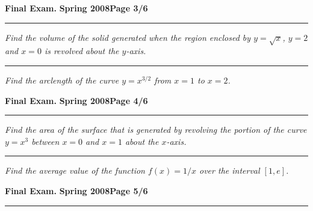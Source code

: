 \documentclass[12pt]{article}
\begin{document}
\hfill{\large\bf Final Exam.}\hfill{\large\bf
  Spring 2008}\hfill{\large\bf Page 3/6}\hrule

\bigskip
{\problem[10 pts] \em Find the volume of the solid generated when the region enclosed by $y=\sqrt{x}$, $y=2$ and $x=0$ is revolved about the $y$-axis.}
\vspace{8.5cm}
\begin{flushright}
\end{flushright}
\hrule
{\problem[10 pts] \em Find the arclength of the curve $y=x^{3/2}$ from $x=1$ to $x=2$.}
\vspace{8.5cm}
\begin{flushright}
\end{flushright}
\newpage

\hfill{\large\bf Final Exam.}\hfill{\large\bf
  Spring 2008}\hfill{\large\bf Page 4/6}\hrule

\bigskip
{\problem[10 pts] \em Find the area of the surface that is generated by revolving the portion of the curve $y=x^3$ between $x=0$ and $x=1$ about the $x$-axis.}
\vspace{8.5cm}
\begin{flushright}
\end{flushright}
\hrule
{\problem[10 pts] \em Find the average value of the function $f(x) = 1/x$ over the interval $[1,e]$.}
\vspace{8.5cm}
\begin{flushright}
\end{flushright}
\newpage

\hfill{\large\bf Final Exam.}\hfill{\large\bf
  Spring 2008}\hfill{\large\bf Page 5/6}\hrule
\end{document}
